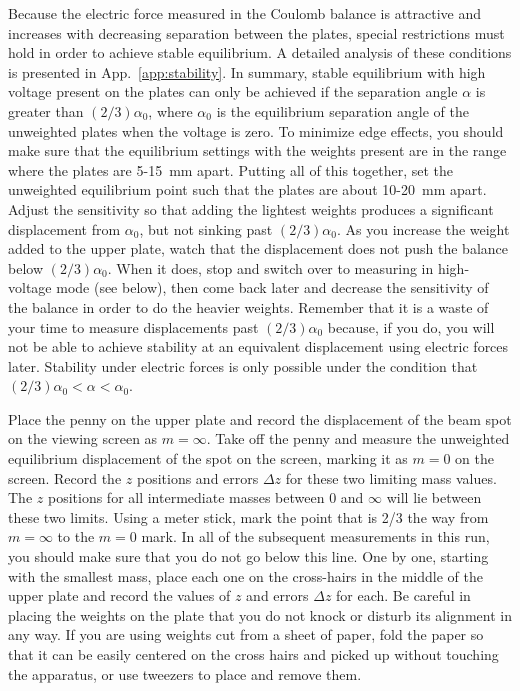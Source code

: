 \documentclass{revtex4}
\begin{document}
Because the electric force measured in the Coulomb balance is attractive
and increases with decreasing separation between the plates, special
restrictions must hold in order to achieve stable equilibrium.  A detailed
analysis of these conditions is presented in App.~\ref{app:stability}.
In summary, stable equilibrium with high voltage present on the plates
can only be achieved if the separation angle $\alpha$ is greater than
$(2/3)\alpha_0$, where $\alpha_0$ is the equilibrium separation angle 
of the unweighted plates when the voltage is zero.  To minimize edge
effects, you should make sure that the equilibrium settings with the
weights present are in the range where the plates are 5-15~mm
apart.  Putting all of this together, set the unweighted equilibrium
point such that the plates are about 10-20~mm apart.  Adjust the sensitivity
so that adding the lightest weights produces a significant displacement
from $\alpha_0$, but not sinking past $(2/3)\alpha_0$.  As you increase
the weight added to the upper plate, watch that the displacement does
not push the balance below $(2/3)\alpha_0$.  When it does,
stop and switch over to measuring in high-voltage mode (see below), then
come back later and decrease the sensitivity of the balance in order to
do the heavier weights.  Remember that it is a waste of your
time to measure displacements past $(2/3)\alpha_0$ because, if you do,
you will not be able to achieve stability at an equivalent displacement
using electric forces later.  Stability under electric forces is only
possible under the condition that $(2/3)\alpha_0<\alpha<\alpha_0$.

Place the penny on the upper plate and record the displacement of the beam
spot on the viewing screen as $m=\infty$.  Take off the penny and measure the
unweighted equilibrium displacement of the spot on the screen, marking it
as $m=0$ on the screen.  Record the $z$ positions and errors $\Delta z$ for
these two limiting mass values.  The $z$ positions for all intermediate
masses between 0 and $\infty$ will lie between these two limits.  Using a
meter stick, mark the point that is
2/3 the way from $m=\infty$ to the $m=0$ mark.  In all of the subsequent
measurements in this run, you should make sure that you do not go below
this line.  One by one, starting with the smallest mass, place each one
on the cross-hairs in the middle of the upper plate and record the
values of $z$ and errors $\Delta z$ for each.  Be careful in placing the
weights on the plate that you do not knock or disturb its alignment in any
way.  If you are using weights cut from a sheet of paper, fold the paper
so that it can be easily centered on the cross hairs and picked up without
touching the apparatus, or use tweezers to place and remove them.
\end{document}
